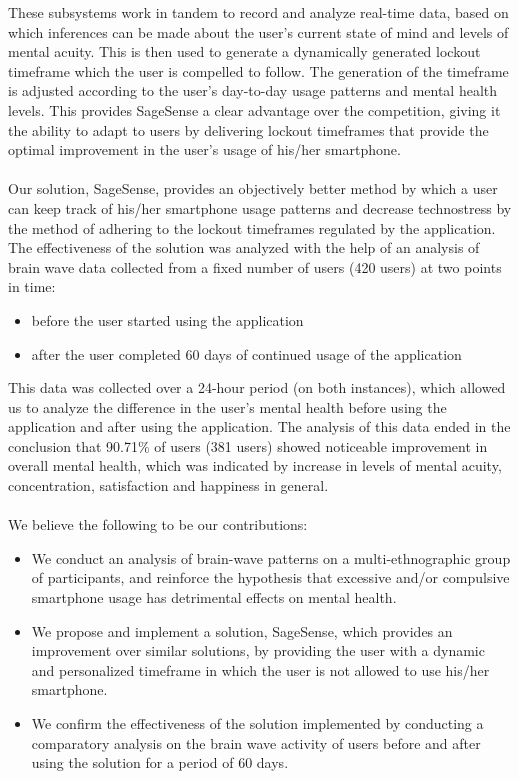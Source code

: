 \documentclass{article}
\begin{document}
These subsystems work in tandem to record and analyze real-time data, based on which inferences can be made about the user's current state of mind and levels of mental acuity. This is then used to generate a dynamically generated lockout timeframe which the user is compelled to follow. The generation of the timeframe is adjusted according to the user's day-to-day usage patterns and mental health levels. This provides SageSense a clear advantage over the competition, giving it the ability to adapt to users by delivering lockout timeframes that provide the optimal improvement in the user's usage of his/her smartphone.

\paragraph{} Our solution, SageSense, provides an objectively better method by which a user can keep track of his/her smartphone usage patterns and decrease technostress by the method of adhering to the lockout timeframes regulated by the application. The effectiveness of the solution was analyzed with the help of an analysis of brain wave data collected from a fixed number of users (420 users) at two points in time:

\begin{itemize}
    \item before the user started using the application
    \item after the user completed 60 days of continued usage of the application
\end{itemize}

This data was collected over a 24-hour period (on both instances), which allowed us to analyze the difference in the user's mental health before using the application and after using the application. The analysis of this data ended in the conclusion that 90.71\% of users (381 users) showed noticeable improvement in overall mental health, which was indicated by increase in levels of mental acuity, concentration, satisfaction and happiness in general.

\paragraph{} We believe the following to be our contributions:
\begin{itemize}
    \item We conduct an analysis of brain-wave patterns on a multi-ethnographic group of participants, and reinforce the hypothesis that excessive and/or compulsive smartphone usage has detrimental effects on mental health.
    \item We propose and implement a solution, SageSense, which provides an improvement over similar solutions, by providing the user with a dynamic and personalized timeframe in which the user is not allowed to use his/her smartphone.
    \item We confirm the effectiveness of the solution implemented by conducting a comparatory analysis on the brain wave activity of users before and after using the solution for a period of 60 days.
\end{itemize}


\newpage
\printbibliography
\end{document}
